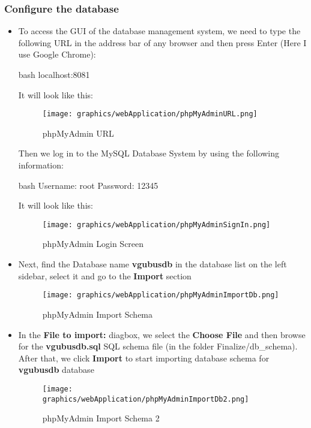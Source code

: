 \subsubsection{Configure the database}
\begin{itemize}
    \item To access the GUI of the database management system, we need to type the following URL in the address bar of any browser and then press Enter (Here I use Google Chrome): 

    \begin{code}{bash}
        localhost:8081
    \end{code}
    It will look like this:
    \begin{figure}[H]
            \centering
            \texttt{[image: graphics/webApplication/phpMyAdminURL.png]}
            \caption{phpMyAdmin URL}
        \label{fig:phpmyadminurl}
    \end{figure}

    Then we log in to the MySQL Database System by using the following information:
    \begin{code}{bash}
        Username: root
        Password: 12345
    \end{code}
    It will look like this:
    \begin{figure}[H]
            \centering
            \texttt{[image: graphics/webApplication/phpMyAdminSignIn.png]}
            \caption{phpMyAdmin Login Screen}
        \label{fig:phpmyadminlogin}
    \end{figure}


    \item Next, find the Database name \textbf{vgubusdb} in the database list on the left sidebar, select it and go to the \textbf{Import} section
    \begin{figure}[H]
            \centering
            \texttt{[image: graphics/webApplication/phpMyAdminImportDb.png]}
            \caption{phpMyAdmin Import Schema}
        \label{fig:phpmyadminimport1}
    \end{figure}


    \item  In the \textbf{File to import:} diagbox, we select the \textbf{Choose File} and then browse for the \textbf{vgubusdb.sql} SQL schema file (in the folder Finalize/db\_schema). After that, we click \textbf{Import} to start importing database schema for \textbf{vgubusdb} database
    \begin{figure}[H]
            \centering
            \texttt{[image: graphics/webApplication/phpMyAdminImportDb2.png]}
            \caption{phpMyAdmin Import Schema 2}
        \label{fig:phpmyadminimport2}
    \end{figure}



\end{itemize}

